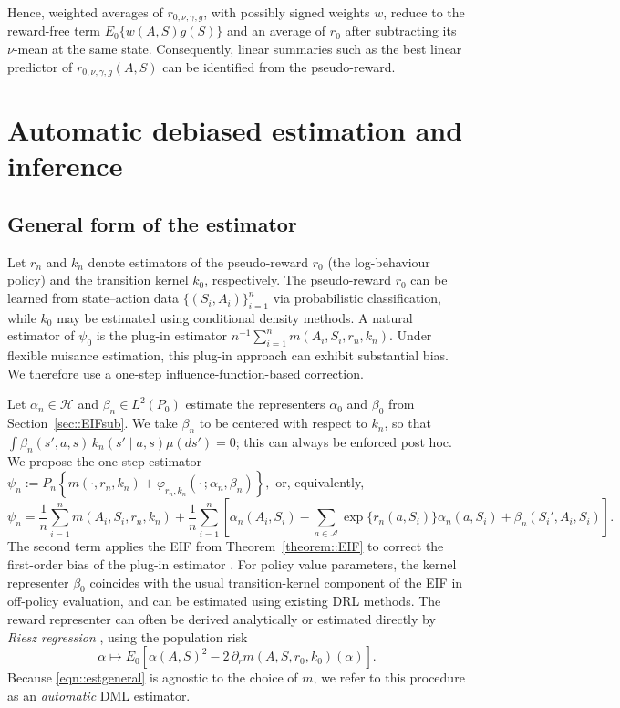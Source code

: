 \documentclass[12pt]{article}
\theoremstyle{plain}
\begin{document}
\noindent Hence, weighted averages of \(r_{0,\nu,\gamma,g}\), with possibly
signed weights \(w\), reduce to the reward-free term \(E_0\{w(A,S)g(S)\}\) and
an average of \(r_0\) after subtracting its \(\nu\)-mean at the same state.
Consequently, linear summaries such as the best linear predictor of
\(r_{0,\nu,\gamma,g}(A,S)\) can be identified from the pseudo-reward.

\section{Automatic debiased estimation and inference}
\label{sec::est}


\subsection{General form of the estimator}

Let $r_n$ and $k_n$ denote estimators of the pseudo-reward $r_0$
(the log-behaviour policy) and the transition kernel $k_0$, respectively.
The pseudo-reward $r_0$ can be learned from state–action data
$\{(S_i,A_i)\}_{i=1}^n$ via probabilistic classification, while $k_0$ may be
estimated using conditional density methods.  
A natural estimator of $\psi_0$ is the plug-in estimator
$n^{-1}\sum_{i=1}^n m(A_i,S_i,r_n,k_n)$.
Under flexible nuisance estimation, this plug-in approach can exhibit
substantial bias. We therefore use a one-step influence-function-based correction.

Let $\alpha_n \in \mathcal{H}$ and $\beta_n \in L^2(P_0)$ estimate the
representers $\alpha_0$ and $\beta_0$ from Section~\ref{sec::EIFsub}. We take
$\beta_n$ to be centered with respect to $k_n$, so that
$\int \beta_n(s',a,s)\,k_n(s' \mid a, s)\mu(ds')=0$; this can always be enforced post hoc. We propose the one-step estimator $\psi_n
:=
P_n\!\left\{
m(\cdot,r_n,k_n)
+
\varphi_{r_n,k_n}(\cdot\,;\alpha_n,\beta_n)
\right\},$ or, equivalently,
\begin{equation}
\psi_n
= \frac{1}{n}\sum_{i=1}^n m(A_i,S_i,r_n,k_n)
  + \frac{1}{n}\sum_{i=1}^n\!\left[
      \alpha_n(A_i,S_i)
      - \sum_{a\in\mathcal{A}}
          \exp\{r_n(a,S_i)\}\alpha_n(a,S_i)
      + \beta_n(S_i',A_i,S_i)
    \right].
\label{eqn::estgeneral}
\end{equation}
The second term applies the EIF from Theorem~\ref{theorem::EIF} to correct the
first-order bias of the plug-in estimator \citep{bickel1993efficient}. For policy
value parameters, the kernel representer \(\beta_0\) coincides with the usual
transition-kernel component of the EIF in off-policy evaluation, and can be
estimated using existing DRL methods. The reward representer can often be
derived analytically or estimated directly by \textit{Riesz regression}
\citep{chernozhukov2022automatic,van2025automatic}, using the population risk
\[
\alpha \mapsto E_0\left[\alpha(A,S)^2
-2\,\partial_r m(A,S,r_0,k_0)(\alpha)\right].
\]
Because \eqref{eqn::estgeneral} is agnostic to the choice of \(m\), we refer to
this procedure as an \emph{automatic} DML estimator.
\end{document}
